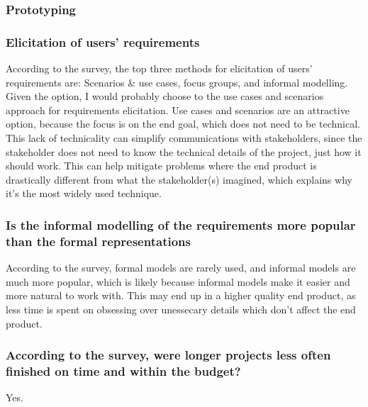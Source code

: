\documentclass[letterpaper,12pt]{article}
\begin{document}
\subsubsection{Prototyping}
\lipsum[66]
\subsubsection{Elicitation of users' requirements}

According to the survey, the top three methods for
elicitation of users’ requirements are: Scenarios \& use cases, focus groups, and informal modelling.
Given the option, I would probably choose to the use cases and scenarios approach for requirements
elicitation. Use cases and scenarios are an attractive option, because the focus is on the end goal,
which does not need to be technical. This lack of technicality can simplify communications with stakeholders,
since the stakeholder does not need to know the technical details of the project, just how it should work.
This can help mitigate problems where the end product is drastically different from what the stakeholder(s)
imagined, which explains why it's the most widely used technique.

\subsubsection{Is the informal modelling of the requirements more
 popular than the formal representations}

According to the survey, formal models are rarely used, and informal models are
much more popular, which is likely because informal models make it easier and more
natural to work with. This may end up in a higher quality end product, as less time
is spent on obsessing over unessecary details which don't affect the end product.
\subsubsection{According to the survey, were longer projects less often finished on
 time and within the budget?}
Yes.
\end{document}
